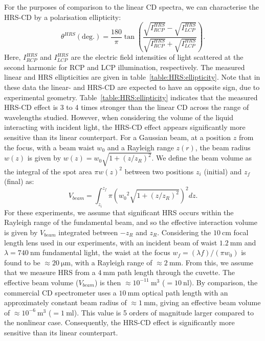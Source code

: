 For the purposes of comparison to the linear CD spectra, we can characterise the HRS-CD by a polarisation ellipticity:
\begin{equation}
    \theta^{HRS} (\text{deg.}) = \frac{180}{\pi} \tan\left( \frac{\sqrt{I_{RCP}^{HRS}} - \sqrt{I_{LCP}^{HRS}}}{\sqrt{I_{RCP}^{HRS}} + \sqrt{I_{LCP}^{HRS}}} \right).
\end{equation}
Here, $I_{RCP}^{HRS}$ and $I_{LCP}^{HRS}$ are the electric field intensities of light scattered at the second harmonic for RCP and LCP illumination, respectively. 
The measured linear and HRS ellipticities are given in table~\ref{table:HRS:ellipticity}. Note that in these data the linear- and HRS-CD are expected to have an opposite sign, due to experimental geometry.
Table~\ref{table:HRS:ellipticity} indicates that the measured HRS-CD effect is 3 to 4 times stronger than the linear CD across the range of wavelengths studied. However, when considering the volume of the liquid interacting with incident light, the HRS-CD effect appears significantly more sensitive than its linear counterpart. 
For a Gaussian beam, at a position $z$ from the focus, with a beam waist $w_0$ and a Rayleigh range $z(r)$, the beam radius $w(z)$ is given by $w(z) = {w_0}\sqrt {1 + (z/z_R)^2}$. 
We define the beam volume as the integral of the spot area $\pi w(z)^2$ between two positions $z_i$ (initial) and $z_f$ (final) as:
\begin{equation}
    V_{beam} = \int^{z_f}_{z_i} \pi \left( {w_0}^2 \sqrt {1 + (z/z_R)^2} \right)^2 dz.
\end{equation} 
For these experiments, we assume that significant HRS occurs within the Rayleigh range of the fundamental beam, and so the effective interaction volume is given by $V_{beam}$ integrated between $-z_R$ and $z_R$. 
Considering the $\SI{10}{\centi\m}$ focal length lens used in our experiments, with an incident beam of waist $\SI{1.2}{\milli\m}$ and $\lambda = \SI{740}{\nano\m}$ fundamental light, the waist at the focus ${w_f} = (\lambda f)/(\pi {w_0})$ is found to be $\approx \SI{20}{\micro\m}$, with a Rayleigh range of $\approx \SI{2}{\milli\m}$. From this, we assume that we measure HRS from a $\SI{4}{\milli\m}$ path length through the cuvette. 
The effective beam volume ($V_{beam}$) is then $\approx 10^{-11}\SI{}{\m\cubed}$ ($=\SI{10}{\nano\litre}$). 
By comparison, the commercial CD spectrometer uses a $\SI{10}{\milli\m}$ optical path length with an approximately constant beam radius of $\approx \SI{1}{\milli\m}$, giving an effective beam volume of  $\approx 10^{-6}\SI{}{\m\cubed}$ ($=\SI{1}{\milli\litre}$). 
This value is 5 orders of magnitude larger compared to the nonlinear case. Consequently, the HRS-CD effect is significantly more sensitive than its linear counterpart. 

